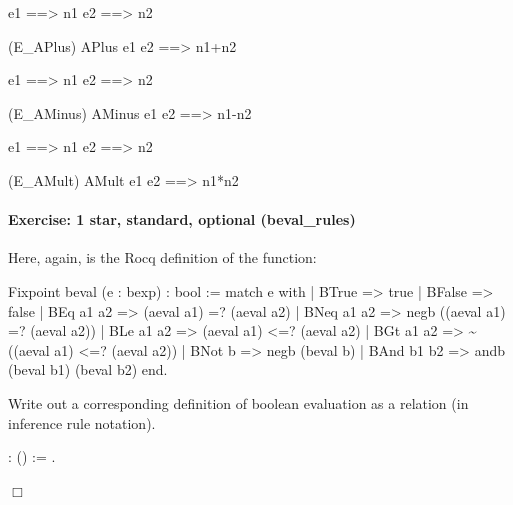 \documentclass[12pt]{report}
\begin{document}
                               e1 ==> n1
                               e2 ==> n2
\par
\noindent\hrulefill\par
\noindent{}                         (E\_APlus)
                         APlus e1 e2 ==> n1+n2


                               e1 ==> n1
                               e2 ==> n2
\par
\noindent\hrulefill\par
\noindent{}                        (E\_AMinus)
                        AMinus e1 e2 ==> n1-n2


                               e1 ==> n1
                               e2 ==> n2
\par
\noindent\hrulefill\par
\noindent{}                         (E\_AMult)
                         AMult e1 e2 ==> n1*n2


\paragraph{Exercise: 1 star, standard, optional (beval\_rules)}




    Here, again, is the Rocq definition of the  function:


  Fixpoint beval (e : bexp) : bool :=
    match e with
    | BTrue       => true
    | BFalse      => false
    | BEq a1 a2   => (aeval a1) =? (aeval a2)
    | BNeq a1 a2  => negb ((aeval a1) =? (aeval a2))
    | BLe a1 a2   => (aeval a1) <=? (aeval a2)
    | BGt a1 a2   => \~{}((aeval a1) <=? (aeval a2))
    | BNot b      => negb (beval b)
    | BAnd b1 b2  => andb (beval b1) (beval b2)
    end.


    Write out a corresponding definition of boolean evaluation as a
    relation (in inference rule notation). 
\begin{coqdoccode}
\coqdocemptyline
\coqdocnoindent
{}  :  () := .\coqdoceol
\end{coqdoccode}
\ensuremath{\Box} 
\begin{coqdoccode}
\coqdocemptyline
\end{coqdoccode}
\end{document}
